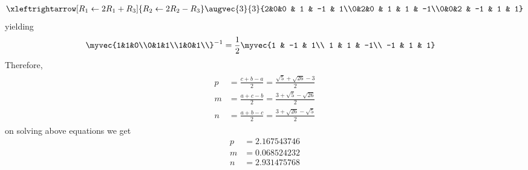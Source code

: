 \documentclass[11pt]{book}
\begin{document}
\begin{enumerate}[label=\thesection.\arabic*.,ref=\thesection.\theenumi]
\begin{align}
			\xleftrightarrow[R_1 \leftarrow 2R_1 + R_3]{R_2 \leftarrow 2R_2 - R_3}
			\augvec{3}{3}{2&0&0 & 1 & -1 & 1\\0&2&0 & 1 & 1 & -1\\0&0&2 & -1 & 1 & 1}
\end{align}
yielding
\begin{align}
			\myvec{1&1&0\\0&1&1\\1&0&1\\}^{-1} &= 
			\frac{1}{2}\myvec{1 & -1 & 1\\ 1 & 1 & -1\\ -1 & 1 & 1}
	\end{align}
	Therefore,
\begin{align}
\begin{split}
    p&=\frac{c+b-a}{2}
    =\frac{\sqrt{5}+\sqrt{26}-3}{2}
    \\
    m&=\frac{a+c-b}{2}
    =\frac{3+\sqrt{5}-\sqrt{26}}{2}
    \\
    n&=\frac{a+b-c}{2}
    =\frac{3+\sqrt{26}-\sqrt{5}}{2}
\end{split}
\label{eq:incircle-mnp}
\end{align}
on solving above equations we get
\begin{align}
	p &= 2.167543746\\
	m &= 0.068524232\\
	n &= 2.931475768
\end{align}
 

\end{enumerate}
\end{document}
